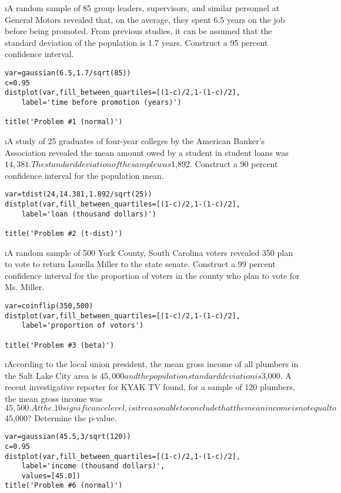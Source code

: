 \be
\newpage
\i A random sample of 85 group leaders, supervisors, and similar personnel at General Motors revealed that, on the average, they spent 6.5 years on the job before being promoted. From previous studies, it can be assumed that the standard deviation of the population is 1.7 years. Construct a 95 percent confidence interval.

\begin{lstlisting}
var=gaussian(6.5,1.7/sqrt(85))
c=0.95
distplot(var,fill_between_quartiles=[(1-c)/2,1-(1-c)/2],
    label='time before promotion (years)')
    
title('Problem #1 (normal)')
\end{lstlisting}


\newpage
\i A study of 25 graduates of four-year colleges by the American Banker's Association revealed the mean amount owed by a student in student loans was $14,381. The standard deviation of the sample was $1,892. Construct a 90 percent confidence interval for the population mean.

\begin{lstlisting}
var=tdist(24,14.381,1.892/sqrt(25))
distplot(var,fill_between_quartiles=[(1-c)/2,1-(1-c)/2],
    label='loan (thousand dollars)')
    
title('Problem #2 (t-dist)')
\end{lstlisting}


\newpage
\i A random sample of 500 York County, South Carolina voters revealed 350 plan to vote to return Louella Miller to the state senate. Construct a 99 percent confidence interval for the proportion of voters in the county who plan to vote for Ms. Miller. 
\begin{lstlisting}
var=coinflip(350,500)
distplot(var,fill_between_quartiles=[(1-c)/2,1-(1-c)/2],
    label='proportion of votors')
    
title('Problem #3 (beta)')
\end{lstlisting}

\newpage
\i According to the local union president, the mean gross income of all plumbers in the Salt Lake City area is $45,000 and the population standard deviation is $3,000. A recent investigative reporter for KYAK TV found, for a sample of 120 plumbers, the mean gross income was $45,500. At the .10 significance level, is it reasonable to conclude that the mean income is not equal to $45,000? Determine the p-value.
\begin{lstlisting}
var=gaussian(45.5,3/sqrt(120))
c=0.95
distplot(var,fill_between_quartiles=[(1-c)/2,1-(1-c)/2],
    label='income (thousand dollars)',
    values=[45.0])
title('Problem #6 (normal)')
\end{lstlisting}

